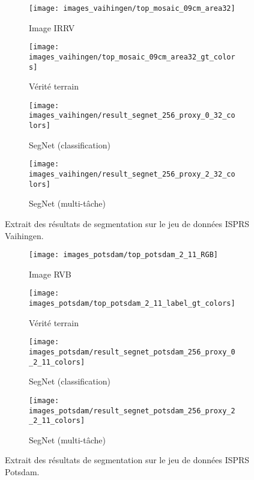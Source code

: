 \begin{figure}[t]
\begin{subfigure}{0.24\textwidth}
	\texttt{[image: images\_vaihingen/top\_mosaic\_09cm\_area32]}
    \caption{Image IRRV}
\end{subfigure}
\begin{subfigure}{0.24\textwidth}
	\texttt{[image: images\_vaihingen/top\_mosaic\_09cm\_area32\_gt\_colors]}
    \caption{Vérité terrain}
\end{subfigure}
\begin{subfigure}{0.24\textwidth}
	\texttt{[image: images\_vaihingen/result\_segnet\_256\_proxy\_0\_32\_colors]}
    \caption{SegNet (classification)}
\end{subfigure}
\begin{subfigure}{0.24\textwidth}
	\texttt{[image: images\_vaihingen/result\_segnet\_256\_proxy\_2\_32\_colors]}
    \caption{SegNet (multi-tâche)}
\end{subfigure}
\caption[Extrait des résultats de segmentation sur le jeu de données ISPRS Vaihingen.]{Extrait des résultats de segmentation sur le jeu de données ISPRS Vaihingen.\\\isprslegende}
\label{fig:isprs_vaihingen}
\end{figure}

\begin{figure}[t]
\begin{subfigure}{0.24\textwidth}
	\texttt{[image: images\_potsdam/top\_potsdam\_2\_11\_RGB]}
    \caption{Image RVB}
\end{subfigure}
\hfill
\begin{subfigure}{0.24\textwidth}
	\texttt{[image: images\_potsdam/top\_potsdam\_2\_11\_label\_gt\_colors]}
    \caption{Vérité terrain}
\end{subfigure}
\hfill
\begin{subfigure}{0.24\textwidth}
	\texttt{[image: images\_potsdam/result\_segnet\_potsdam\_256\_proxy\_0\_2\_11\_colors]}
    \caption{SegNet (classification)}
\end{subfigure}
\hfill
\begin{subfigure}{0.24\textwidth}
	\texttt{[image: images\_potsdam/result\_segnet\_potsdam\_256\_proxy\_2\_2\_11\_colors]}
    \caption{SegNet (multi-tâche)}
\end{subfigure}
\caption[Extrait des résultats de segmentation sur le jeu de données ISPRS Potsdam.]{Extrait des résultats de segmentation sur le jeu de données ISPRS Potsdam.\\\isprslegende}
\label{fig:isprs_potsdam}
\end{figure}

